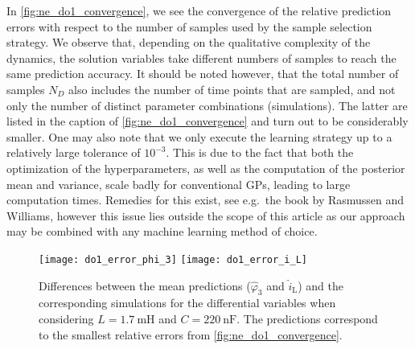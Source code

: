 \documentclass[AMA,STIX1COL]{WileyNJD-v2}
\newcommand{\mr}[1]{\mathrm{#1}}
\begin{document}
In \autoref{fig:ne_do1_convergence}, we see the convergence of the relative prediction errors with respect to the number of samples used by the sample selection strategy. We observe that, depending on the qualitative complexity of the dynamics, the solution variables take different numbers of samples to reach the same prediction accuracy. It should be noted however, that the total number of samples $N_D$ also includes the number of time points that are sampled, and not only the number of distinct parameter combinations (simulations). The latter are listed in the caption of \autoref{fig:ne_do1_convergence} and turn out to be considerably smaller. One may also note that we only execute the learning strategy up to a relatively large tolerance of $10^{-3}$. This is due to the fact that both the optimization of the hyperparameters, as well as the computation of the posterior mean and variance, scale badly for conventional GPs, leading to large computation times. Remedies for this exist, see e.g.~the book by Rasmussen and Williams\cite{rasmussen2006}, however this issue lies outside the scope of this article as our approach may be combined with any machine learning method of choice.
\begin{figure}[t]
    \begin{center}
        \texttt{[image: do1\_error\_phi\_3]} \hspace{1.5cm} \texttt{[image: do1\_error\_i\_L]}
    \end{center}
    \caption{Differences between the mean predictions ($\hat{\varphi}_3$ and $\hat{i}_\mr{L}$) and the corresponding simulations for the differential variables when considering $L = \SI{1.7}{\milli\henry}$ and $C = \SI{220}{\nano\farad}$. The predictions correspond to the smallest relative errors from \autoref{fig:ne_do1_convergence}.}
    \label{fig:ne_do1_error_d}
\end{figure}
\end{document}

